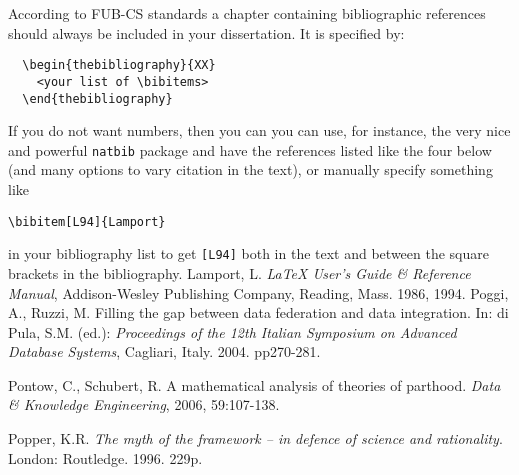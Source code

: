 \begin{thebibliography}{XX}
\small
{}
According to FUB-CS standards a chapter containing bibliographic
references should always be included in your dissertation.
It is specified by:
\begin{verbatim}
  \begin{thebibliography}{XX}
    <your list of \bibitems>
  \end{thebibliography}
\end{verbatim}
If you do not want numbers, then you can you can use, for instance, the very nice and powerful \texttt{natbib} package and have the references listed like the four below (and many options to vary citation in the text), or manually specify something like
\begin{verbatim}
\bibitem[L94]{Lamport}
\end{verbatim}
in your bibliography list to get \verb|[L94]| both in the text and between the square brackets in the bibliography. 
Lamport, L. {\em \LaTeX{} User's Guide \& Reference
Manual\/}, Addison-Wesley Publishing Company, Reading, Mass. 1986, 1994.
Poggi, A., Ruzzi, M. Filling the gap between data federation and data integration. In: di Pula, S.M. (ed.): \emph{Proceedings of the 12th Italian Symposium on Advanced Database Systems}, Cagliari, Italy. 2004. pp270-281.

	Pontow, C., Schubert, R. A mathematical analysis of theories of parthood. \emph{Data \& Knowledge Engineering}, 2006, 59:107-138.

	Popper, K.R. \emph{The myth of the framework -- in defence of science and rationality}. London: Routledge. 1996. 229p.
\end{thebibliography}


